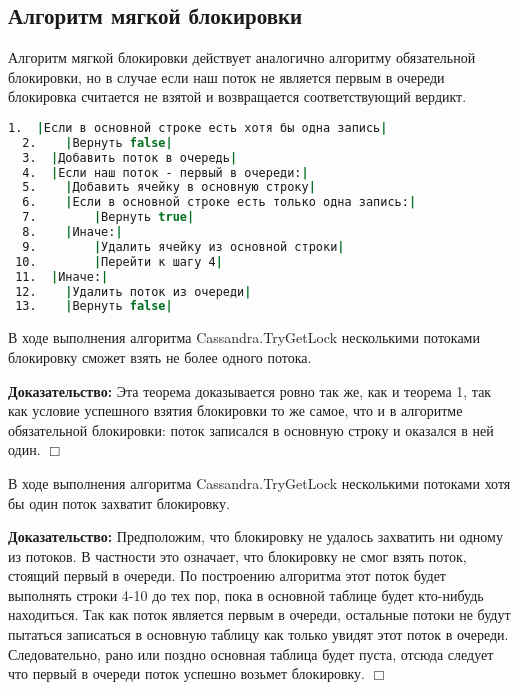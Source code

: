 \subsection{Алгоритм мягкой блокировки}

Алгоритм мягкой блокировки действует аналогично алгоритму обязательной блокировки, но в случае если наш поток не является первым в очереди блокировка считается не взятой и возвращается соответствующий вердикт.

\begin{lstlisting}[language=csh,caption={Алгоритм Cassandra.TryGetLock(lockId, threadId)}]
  1.  |Если в основной строке есть хотя бы одна запись|
  2.  	|Вернуть false|
  3.  |Добавить поток в очередь|
  4.  |Если наш поток - первый в очереди:|
  5.  	|Добавить ячейку в основную строку|
  6.  	|Если в основной строке есть только одна запись:|
  7.  		|Вернуть true|
  8.  	|Иначе:|
  9.  		|Удалить ячейку из основной строки|
 10.  		|Перейти к шагу 4|
 11.  |Иначе:|
 12.  	|Удалить поток из очереди|
 13.  	|Вернуть false|
\end{lstlisting}

\begin{theorem}
В ходе выполнения алгоритма Cassandra.TryGetLock несколькими потоками блокировку сможет взять не более одного потока.
\end{theorem}
\textbf{Доказательство:}
Эта теорема доказывается ровно так же, как и теорема 1, так как условие успешного взятия блокировки то же самое, что и в алгоритме обязательной блокировки: поток записался в основную строку и оказался в ней один.
$\Box$

\begin{theorem}
В ходе выполнения алгоритма Cassandra.TryGetLock несколькими потоками хотя бы один поток захватит блокировку.
\end{theorem}
\textbf{Доказательство:}
Предположим, что блокировку не удалось захватить ни одному из потоков. В частности это означает, что блокировку не смог взять поток, стоящий первый в очереди. По построению алгоритма этот поток будет выполнять строки 4-10 до тех пор, пока в основной таблице будет кто-нибудь находиться. Так как поток является первым в очереди, остальные потоки не будут пытаться записаться в основную таблицу как только увидят этот поток в очереди. Следовательно, рано или поздно основная таблица будет пуста, отсюда следует что первый в очереди поток успешно возьмет блокировку.
$\Box$
